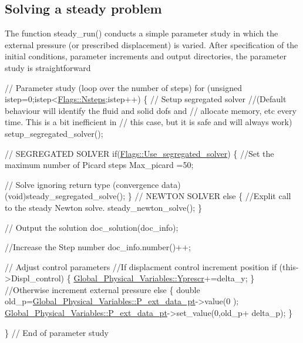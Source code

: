 \hypertarget{index_steady}{}\subsection{Solving a steady problem}\label{index_steady}
The function {\ttfamily steady\+\_\+run()} conducts a simple parameter study in which the external pressure (or prescribed displacement) is varied. After specification of the initial conditions, parameter increments and output directories, the parameter study is straightforward  
\begin{DoxyCodeInclude}
 \textcolor{comment}{// Parameter study (loop over the number of steps)}
 \textcolor{keywordflow}{for} (\textcolor{keywordtype}{unsigned} istep=0;istep<\hyperlink{namespaceFlags_a8a6ffdb261330ef89965624209ab7b00}{Flags::Nsteps};istep++)
  \{
   \textcolor{comment}{// Setup segregated solver }
   \textcolor{comment}{//(Default behaviour will identify the fluid and solid dofs and}
   \textcolor{comment}{// allocate memory, etc every time. This is a bit inefficient in }
   \textcolor{comment}{// this case, but it is safe and will always work)}
   setup\_segregated\_solver();

   \textcolor{comment}{// SEGREGATED SOLVER}
   \textcolor{keywordflow}{if}(\hyperlink{namespaceFlags_a2cdfa6b776b959a060a1f2e8d4918789}{Flags::Use\_segregated\_solver})
    \{
     \textcolor{comment}{//Set the maximum number of Picard steps}
     Max\_picard =50;
     
     \textcolor{comment}{// Solve ignoring return type (convergence data)}
     (void)steady\_segregated\_solve();
    \}
   \textcolor{comment}{// NEWTON SOLVER}
   \textcolor{keywordflow}{else}
    \{
     \textcolor{comment}{//Explit call to the steady Newton solve.}
     steady\_newton\_solve();
    \}
   
   \textcolor{comment}{// Output the solution}
   doc\_solution(doc\_info);
   
   \textcolor{comment}{//Increase the Step number}
   doc\_info.number()++;
   
   \textcolor{comment}{// Adjust control parameters}
   \textcolor{comment}{//If displacment control increment position}
   \textcolor{keywordflow}{if} (this->Displ\_control)
    \{
     \hyperlink{namespaceGlobal__Physical__Variables_afd29cc714595594020831c7c54387883}{Global\_Physical\_Variables::Yprescr}+=delta\_y;
    \}
   \textcolor{comment}{//Otherwise increment external pressure}
   \textcolor{keywordflow}{else}
    \{
     \textcolor{keywordtype}{double} old\_p=\hyperlink{namespaceGlobal__Physical__Variables_ad31ed4ea9a7fce4c20c2230d26047f6f}{Global\_Physical\_Variables::P\_ext\_data\_pt}->value(0
      );
     \hyperlink{namespaceGlobal__Physical__Variables_ad31ed4ea9a7fce4c20c2230d26047f6f}{Global\_Physical\_Variables::P\_ext\_data\_pt}->set\_value(0,old\_p+
      delta\_p);
    \}

  \} \textcolor{comment}{// End of parameter study}

\end{DoxyCodeInclude}




